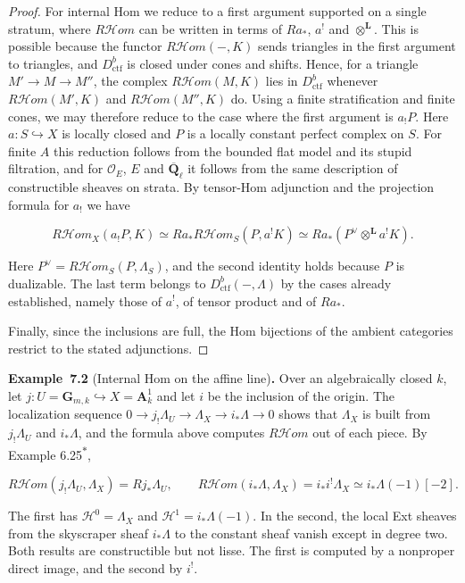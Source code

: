 \documentclass[11pt]{article}
\newenvironment{bpstatement}[2]{\par\addvspace{0.6\baselineskip}\noindent\textbf{#1}#2\textbf{.}\enspace\ignorespaces}
  {\par\addvspace{0.4\baselineskip}}
\newcommand{\bpout}[1]{#1\textsuperscript{\hyperlink{bp-outside}{\ensuremath{\ast}}}}
\providecommand{\cHom}{}\renewcommand{\cHom}{R\mathcal{H}\!om}
\begin{document}
\begin{proof}[{Proof}]
For internal Hom we reduce to a first argument supported on a single stratum, where \(\cHom\) can be written in terms of \(Ra_*\), \(a^!\) and \(\otimes^{\mathbf L}\). This is possible because the functor \(\cHom(-,K)\) sends triangles in the first argument to triangles, and \(D^b_{\mathrm{ctf}}\) is closed under cones and shifts. Hence, for a triangle \(M'\to M\to M''\), the complex \(\cHom(M,K)\) lies in \(D^b_{\mathrm{ctf}}\) whenever \(\cHom(M',K)\) and \(\cHom(M'',K)\) do. Using a finite stratification and finite cones, we may therefore reduce to the case where the first argument is \(a_!P\). Here \(a:S\hookrightarrow X\) is locally closed and \(P\) is a locally constant perfect complex on \(S\). For finite \(A\) this reduction follows from the bounded flat model and its stupid filtration, and for \(\mathcal O_E\), \(E\) and \(\overline{\mathbf Q}_\ell\) it follows from the same description of constructible sheaves on strata. By tensor-Hom adjunction and the projection formula for \(a_!\) we have

\[
\cHom_X(a_!P,K)
\simeq Ra_*\cHom_S(P,a^!K)
\simeq Ra_*(P^\vee\otimes^{\mathbf L}a^!K).
\]

Here \(P^\vee=\cHom_S(P,\Lambda_S)\), and the second identity holds because \(P\) is dualizable. The last term belongs to \(D^b_{\mathrm{ctf}}(-,\Lambda)\) by the cases already established, namely those of \(a^!\), of tensor product and of \(Ra_*\).

Finally, since the inclusions are full, the Hom bijections of the ambient categories restrict to the stated adjunctions.
\end{proof}

\label{bp7}%
\begin{bpstatement}{Example~7.2}{ (Internal Hom on the affine line)}
Over an algebraically closed \(k\), let \(j:U=\mathbf G_{m,k}\hookrightarrow
X=\mathbf A^1_k\) and let \(i\) be the inclusion of the origin. The localization sequence \(0\to j_!\Lambda_U\to\Lambda_X\to i_*\Lambda\to0\) shows that \(\Lambda_X\) is built from \(j_!\Lambda_U\) and \(i_*\Lambda\), and the formula above computes \(\cHom\) out of each piece. By Example \bpout{6.25},

\[
\cHom(j_!\Lambda_U,\Lambda_X)=Rj_*\Lambda_U,
\qquad
\cHom(i_*\Lambda,\Lambda_X)=i_*i^!\Lambda_X\simeq i_*\Lambda(-1)[-2].
\]

The first has \(\mathcal H^0=\Lambda_X\) and \(\mathcal H^1=i_*\Lambda(-1)\). In the second, the local Ext sheaves from the skyscraper sheaf \(i_*\Lambda\) to the constant sheaf vanish except in degree two. Both results are constructible but not lisse. The first is computed by a nonproper direct image, and the second by \(i^!\).
\end{bpstatement}
\end{document}

